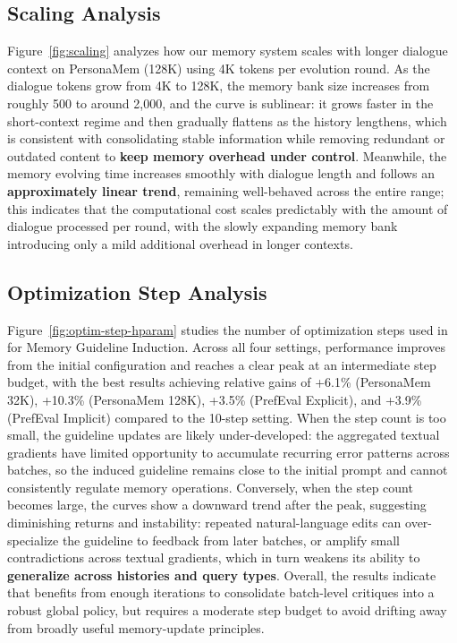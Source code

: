 \subsection{Scaling Analysis}
Figure~\ref{fig:scaling} analyzes how our memory system scales with longer dialogue context on PersonaMem (128K) using 4K tokens per evolution round. As the dialogue tokens grow from 4K to 128K, the memory bank size increases from roughly 500 to around 2,000, and the curve is sublinear: it grows faster in the short-context regime and then gradually flattens as the history lengthens, which is consistent with consolidating stable information while removing redundant or outdated content to \textbf{keep memory overhead under control}. Meanwhile, the memory evolving time increases smoothly with dialogue length and follows an \textbf{approximately linear trend}, remaining well-behaved across the entire range; this indicates that the computational cost scales predictably with the amount of dialogue processed per round, with the slowly expanding memory bank introducing only a mild additional overhead in longer contexts.


\subsection{Optimization Step Analysis}
Figure~\ref{fig:optim-step-hparam} studies the number of optimization steps used in \moduleone for Memory Guideline Induction. Across all four settings, performance improves from the initial configuration and reaches a clear peak at an intermediate step budget, with the best results achieving relative gains of +6.1\% (PersonaMem 32K), +10.3\% (PersonaMem 128K), +3.5\% (PrefEval Explicit), and +3.9\% (PrefEval Implicit) compared to the 10-step setting. When the step count is too small, the guideline updates are likely under-developed: the aggregated textual gradients have limited opportunity to accumulate recurring error patterns across batches, so the induced guideline remains close to the initial prompt and cannot consistently regulate memory operations. Conversely, when the step count becomes large, the curves show a downward trend after the peak, suggesting diminishing returns and instability: repeated natural-language edits can over-specialize the guideline to feedback from later batches, or amplify small contradictions across textual gradients, which in turn weakens its ability to \textbf{generalize across histories and query types}. Overall, the results indicate that \moduleone benefits from enough iterations to consolidate batch-level critiques into a robust global policy, but requires a moderate step budget to avoid drifting away from broadly useful memory-update principles.


